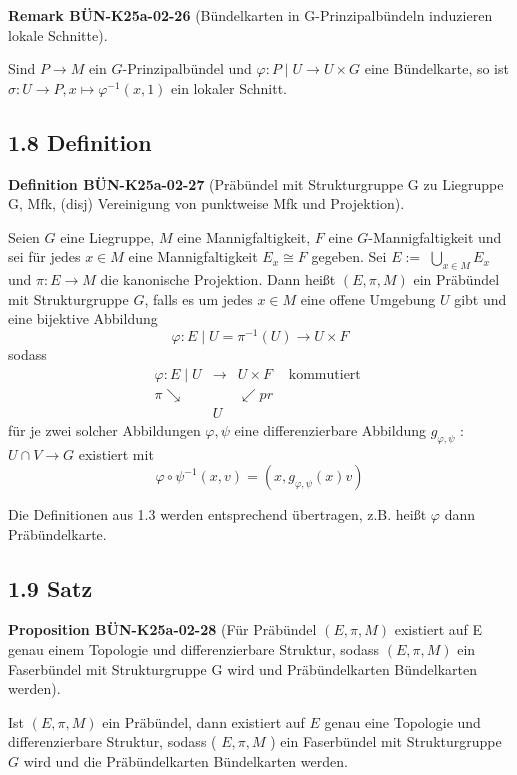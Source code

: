\documentclass[10pt, letterpaper]{article}
\newcommand{\CustomHeading}[3]{%
  \par\medskip\noindent%
  \textbf{#1 #2} \textnormal{(#3)}.\enskip%
}
\newenvironment{DEF}[2]{\begin{unitbox}\CustomHeading{Definition}{#1}{#2}}{\end{unitbox}}
\newenvironment{PROP}[2]{\begin{unitbox}\CustomHeading{Proposition}{#1}{#2}}{\end{unitbox}}
\newenvironment{REM}[2]{\begin{unitbox}\CustomHeading{Remark}{#1}{#2}}{\end{unitbox}}
\begin{document}
\begin{REM}{BÜN-K25a-02-26}{Bündelkarten in G-Prinzipalbündeln induzieren lokale Schnitte}
Sind $P \rightarrow M$ ein $G$-Prinzipalbündel und $\varphi: P \mid U \rightarrow U \times G$ eine Bündelkarte, so ist $\sigma: U \rightarrow P, x \mapsto \varphi^{-1}(x, 1)$ ein lokaler Schnitt.
\end{REM}

\subsection*{1.8 Definition}


\begin{DEF}{BÜN-K25a-02-27}{Präbündel mit Strukturgruppe G zu Liegruppe G, Mfk, (disj) Vereinigung von punktweise Mfk und Projektion}
Seien $G$ eine Liegruppe, $M$ eine Mannigfaltigkeit, $F$ eine $G$-Mannigfaltigkeit und sei für jedes $x \in M$ eine Mannigfaltigkeit $E_{x} \cong F$ gegeben. Sei $E:=$ $\bigcup_{x \in M} E_{x}$ und $\pi: E \rightarrow M$ die kanonische Projektion. Dann heißt $(E, \pi, M)$ ein Präbündel mit Strukturgruppe $G$, falls es um jedes $x \in M$ eine offene Umgebung $U$ gibt und eine bijektive Abbildung
$$
\varphi: E \mid U=\pi^{-1}(U) \rightarrow U \times F
$$
sodass
$$
\begin{array}{rlll}
\varphi: E \mid U & \longrightarrow & U \times F & \text { kommutiert } \\
\pi \searrow & & \swarrow p r & \\
& U & &
\end{array}
$$
für je zwei solcher Abbildungen $\varphi, \psi$ eine differenzierbare Abbildung $g_{\varphi, \psi}$ : $U \cap V \rightarrow G$ existiert mit
$$
\varphi \circ \psi^{-1}(x, v)=\left(x, g_{\varphi, \psi}(x) v\right)
$$
\end{DEF}

Die Definitionen aus 1.3 werden entsprechend übertragen, z.B. heißt $\varphi$ dann Präbündelkarte.

\subsection*{1.9 Satz}
\begin{PROP}{BÜN-K25a-02-28}{Für Präbündel $(E,\pi,M)$ existiert auf E genau einem Topologie und differenzierbare Struktur, sodass $(E,\pi,M)$ ein Faserbündel mit Strukturgruppe G wird und Präbündelkarten Bündelkarten werden}
Ist $(E, \pi, M)$ ein Präbündel, dann existiert auf $E$ genau eine Topologie und differenzierbare Struktur, sodass ( $E, \pi, M$ ) ein Faserbündel mit Strukturgruppe $G$ wird und die Präbündelkarten Bündelkarten werden.
\end{PROP}
\end{document}
